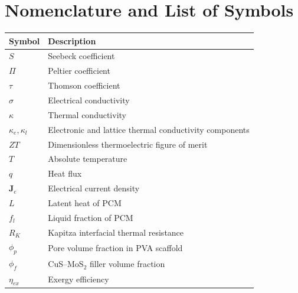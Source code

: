 \documentclass[12pt,a4paper]{report}
\begin{document}
\tableofcontents
\listoffigures
\listoftables

\chapter*{Nomenclature and List of Symbols}
\begin{longtable}{>{\raggedright\arraybackslash}p{3cm}p{10cm}}
\toprule
Symbol & Description \\
\midrule
$S$ & Seebeck coefficient \\
$\Pi$ & Peltier coefficient \\
$\tau$ & Thomson coefficient \\
$\sigma$ & Electrical conductivity \\
$\kappa$ & Thermal conductivity \\
$\kappa_e,\kappa_l$ & Electronic and lattice thermal conductivity components \\
$ZT$ & Dimensionless thermoelectric figure of merit \\
$T$ & Absolute temperature \\
$q$ & Heat flux \\
$\mathbf{J}_e$ & Electrical current density \\
$L$ & Latent heat of PCM \\
$f_l$ & Liquid fraction of PCM \\
$R_K$ & Kapitza interfacial thermal resistance \\
$\phi_p$ & Pore volume fraction in PVA scaffold \\
$\phi_f$ & CuS--MoS$_2$ filler volume fraction \\
$\eta_{ex}$ & Exergy efficiency \\
\bottomrule
\end{longtable}

\clearpage
{}















\end{document}
